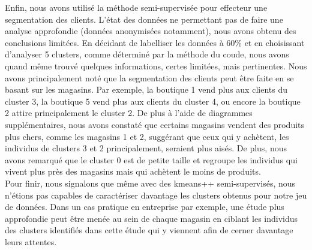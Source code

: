 \documentclass[12pt,a4paper]{book}
\newcommand{\1}{\mathds{1}}
\begin{document}
\noindent
Enfin, nous avons utilisé la méthode semi-supervisée pour effecteur une segmentation des clients. L'état des données ne permettant pas de faire une analyse approfondie (données anonymisées notamment), nous avons obtenu des conclusions limitées. En décidant de labelliser les données à 60\% et en choisissant d'analyser 5 clusters, comme déterminé par la méthode du coude, nous avons quand même trouvé quelques informations, certes limitées, mais pertinentes. Nous avons principalement noté que la segmentation des clients peut être faite en se basant sur les magasins. Par exemple, la boutique 1 vend plus aux clients du cluster 3, la boutique 5 vend plus aux clients du cluster 4, ou encore la boutique 2 attire principalement le cluster 2. De plus à l'aide de diagrammes supplémentaires, nous avons constaté que certains magasins vendent des produits plus chers, comme les magasins 1 et 2, suggérant que ceux qui y achètent, les individus de clusters 3 et 2 principalement, seraient plus aisés. De plus, nous avons remarqué que le cluster 0 est de petite taille et regroupe les individus qui vivent plus près des magasins mais qui achètent le moins de produits.\\

\noindent
Pour finir, nous signalons que même avec des kmeans++ semi-supervisés, nous n'étions pas capables de caractériser davantage les clusters obtenus pour notre jeu de données. Dans un cas pratique en entreprise par exemple, une étude plus approfondie  peut être menée au sein de chaque magasin en ciblant les individus des clusters identifiés dans cette étude qui y viennent afin de cerner davantage leurs attentes.





\nocite{XIN2011}
\nocite{OUM2016}
\nocite{FAB2018}

\renewcommand\bibname{Références}


\end{document}
